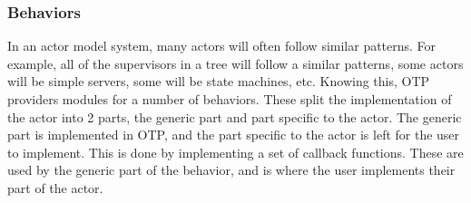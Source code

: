 \documentclass[a4paper]{article}
\begin{document}
\subsubsection{Behaviors}
In an actor model system, many actors will often follow similar patterns. For
example, all of the supervisors in a tree will follow a similar patterns, some
actors will be simple servers, some will be state machines, etc. Knowing this,
OTP providers modules for a number of behaviors. These split the implementation
of the actor into 2 parts, the generic part and part specific to the actor. The
generic part is implemented in OTP, and the part specific to the actor is left
for the user to implement. This is done by implementing a set of callback
functions. These are used by the generic part of the behavior, and is where the
user implements their part of the actor.
\end{document}
